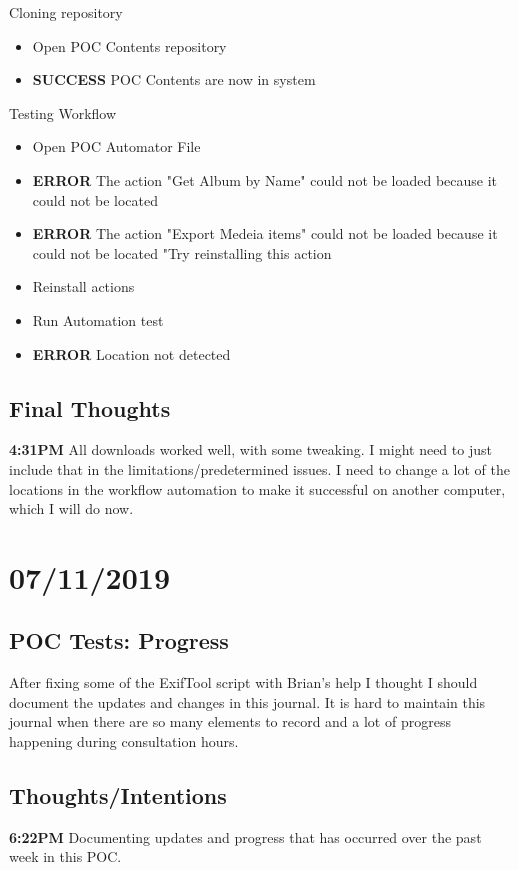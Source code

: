 \documentclass{article}
\begin{document}
Cloning repository
\begin{itemize}
\item Open POC Contents repository
\item \textbf{SUCCESS} POC Contents are now in system
\end{itemize}

Testing Workflow
\begin{itemize}
\item Open POC Automator File
\item \textbf{ERROR} The action "Get Album by Name" could not be loaded because it could not be located
\item \textbf{ERROR} The action "Export Medeia items" could not be loaded because it could not be located "Try reinstalling this action
\item Reinstall actions
\item Run Automation test
\item \textbf{ERROR} Location not detected
\end{itemize}

\subsection{Final Thoughts}
\textbf{4:31PM} All downloads worked well, with some tweaking. I might need to just include that in the limitations/predetermined issues. I need to change a lot of the locations in the workflow automation to make it successful on another computer, which I will do now.

\section{07/11/2019}
\subsection{POC Tests: Progress}
After fixing some of the ExifTool script with Brian's help I thought I should document the updates and changes in this journal. It is hard to maintain this journal when there are so many elements to record and a lot of progress happening during consultation hours.
\subsection{Thoughts/Intentions}
\textbf{6:22PM} Documenting updates and progress that has occurred over the past week in this POC. 
\end{document}
